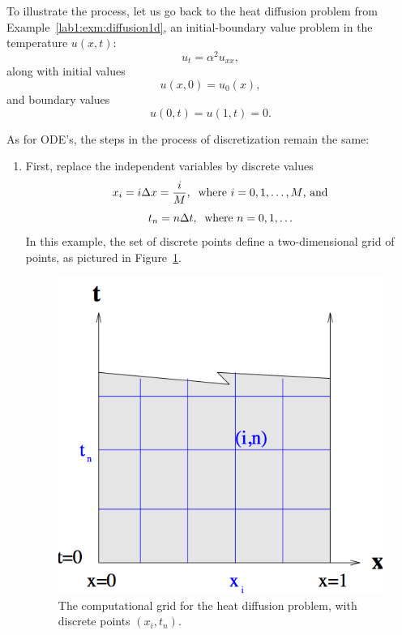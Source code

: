 \begin{example}
  To illustrate the process, let us go back to the heat diffusion
  problem from Example~\ref{lab1:exm:diffusion1d}, an initial-boundary
  value problem in the temperature $u(x,t)$:
  \[
  u_{t} = \alpha^2 u_{xx},
  \]
  along with initial values
  \[
  u(x,0) = u_0(x),
  \]
  and boundary values
  \[
  u(0,t) = u(1,t) = 0.
  \]
  
  As for ODE's, the steps in the process of discretization remain the
  same:
  \begin{enumerate}
  \item First, replace the independent variables by discrete values
    \[
    x_i = i \Delta x = \frac{i}{M}, \;\; \mbox{\rm where $i=0, 1,
      \ldots, M$, and}
    \]
    \[
    t_n = n \Delta t, \;\; \mbox{\rm where $n=0, 1,
      \ldots$}
    \]
    In this example, the set of discrete points define a two-dimensional
    grid of points, as pictured in Figure~\ref{lab1:fig:pde-grid}.
    \begin{figure}[htbp]
      \begin{center}
        \leavevmode
        \includegraphics{pdes/pde-grid}
        \caption{The computational grid for the heat diffusion problem,
          with discrete points $(x_i,t_n)$.}
        \label{lab1:fig:pde-grid}
      \end{center}
    \end{figure}
    

\end{enumerate}
\end{example}
